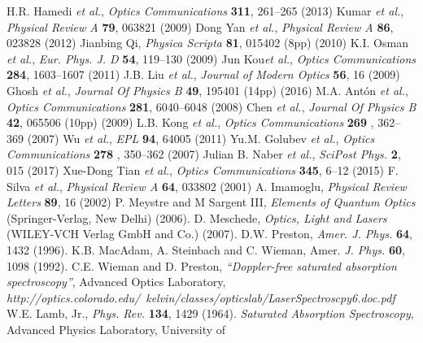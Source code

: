 \begin{thebibliography}{21}
{}H.R. Hamedi \textit{et al.}, \textit{Optics Communications} \textbf{311}, 261–265 (2013)
Kumar \textit{et al.}, \textit{Physical Review A} \textbf{79}, 063821 (2009)
Dong Yan \textit{et al.}, \textit{Physical Review A} \textbf{86}, 023828 (2012)
Jianbing Qi, \textit{Physica Scripta} \textbf{81}, 015402 (8pp) (2010)
 K.I. Osman \textit{et al.}, \textit{Eur. Phys. J. D} \textbf{54}, 119–130 (2009)
Jun Kou\textit{et al.}, \textit{Optics Communications} \textbf{284}, 1603–1607 (2011)
J.B. Liu \textit{et al.}, \textit{Journal of Modern Optics} \textbf{56}, 16 (2009)
Ghosh \textit{et al.}, \textit{Journal Of Physics B} \textbf{49}, 195401 (14pp) (2016)
M.A. Antón \textit{et al.}, \textit{Optics Communications} \textbf{281}, 6040–6048 (2008)
Chen \textit{et al.}, \textit{Journal Of Physics B} \textbf{42}, 065506 (10pp) (2009)
L.B. Kong \textit{et al.}, \textit{Optics Communications } \textbf{269 }, 362–369 (2007)
Wu \textit{et al.}, \textit{EPL} \textbf{94}, 64005 (2011)
Yu.M. Golubev \textit{et al.}, \textit{Optics Communications } \textbf{278 }, 350–362 (2007)
Julian B. Naber \textit{et al.}, \textit{SciPost Phys.} \textbf{2}, 015 (2017)
Xue-Dong Tian \textit{et al.}, \textit{Optics Communications } \textbf{345}, 6–12 (2015)
F. Silva \textit{et al.}, \textit{Physical Review A} \textbf{64}, 033802 (2001)
A. Imamoglu, \textit{Physical Review Letters} \textbf{89}, 16 (2002)
\iffalse
{}P. Meystre and M Sargent III, \textit{Elements of Quantum Optics} (Springer-Verlag, New Delhi) (2006).
D. Meschede, \textit{Optics, Light and Lasers} (WILEY-VCH Verlag GmbH and Co.) (2007).
D.W. Preston, \textit{Amer. J. Phys.} \textbf{64}, 1432 (1996).
K.B. MacAdam, A. Steinbach and C. Wieman, Amer. \textit{J. Phys.} \textbf{60}, 1098 (1992).
C.E. Wieman and D. Preston, \textit{“Doppler-free saturated absorption spectroscopy”},
Advanced Optics Laboratory,
\textit{http://optics.colorado.edu/~kelvin/classes/opticslab/LaserSpectroscpy6.doc.pdf}
W.E. Lamb, Jr.,\textit{ Phys. Rev. } \textbf{134}, 1429 (1964).
\textit{Saturated Absorption Spectroscopy}, Advanced Physics Laboratory, University of

\end{thebibliography}
